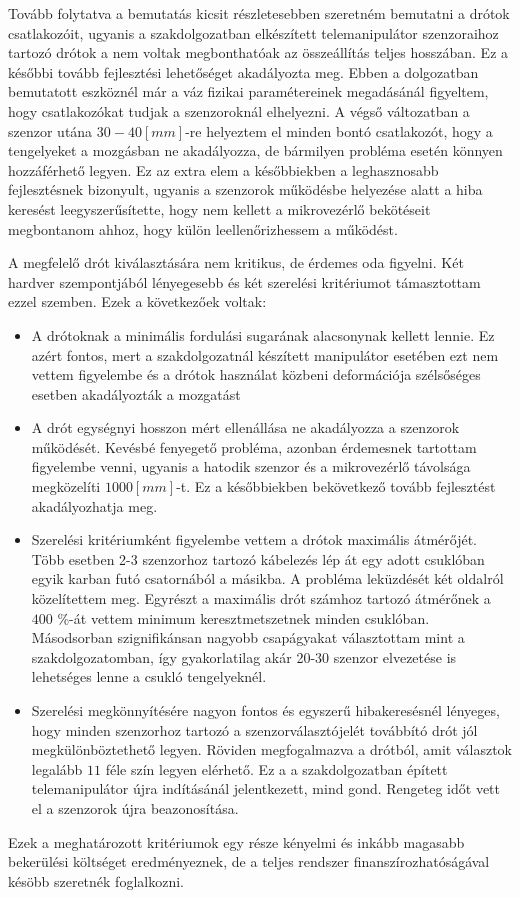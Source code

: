 Tovább folytatva a bemutatás kicsit részletesebben szeretném bemutatni a drótok csatlakozóit, ugyanis a szakdolgozatban elkészített telemanipulátor szenzoraihoz tartozó drótok a nem voltak megbonthatóak az összeállítás teljes hosszában. Ez a későbbi tovább fejlesztési lehetőséget akadályozta meg. Ebben a dolgozatban bemutatott eszköznél már a váz fizikai paramétereinek megadásánál figyeltem, hogy csatlakozókat tudjak a szenzoroknál elhelyezni. A végső változatban a szenzor utána $30-40[mm]$-re helyeztem el minden bontó csatlakozót, hogy a tengelyeket a mozgásban ne akadályozza, de bármilyen probléma esetén könnyen hozzáférhető legyen. Ez az extra elem a későbbiekben a leghasznosabb fejlesztésnek bizonyult, ugyanis a szenzorok működésbe helyezése alatt a hiba keresést leegyszerűsítette, hogy nem kellett a mikrovezérlő bekötéseit megbontanom ahhoz, hogy külön leellenőrizhessem a működést.

A megfelelő drót kiválasztására nem kritikus, de érdemes oda figyelni. Két hardver szempontjából lényegesebb és két szerelési kritériumot támasztottam ezzel szemben. Ezek a következőek voltak:
\begin{itemize}
  \item A drótoknak a minimális fordulási sugarának alacsonynak kellett lennie. Ez azért fontos, mert a szakdolgozatnál készített manipulátor esetében ezt nem vettem figyelembe és a drótok használat közbeni deformációja szélsőséges esetben akadályozták a mozgatást
  \item A drót egységnyi hosszon mért ellenállása ne akadályozza a szenzorok működését. Kevésbé fenyegető probléma, azonban érdemesnek tartottam figyelembe venni, ugyanis a hatodik szenzor és a mikrovezérlő távolsága megközelíti $1000[mm]$-t. Ez a későbbiekben bekövetkező tovább fejlesztést akadályozhatja meg.
  \item Szerelési kritériumként figyelembe vettem a drótok maximális átmérőjét. Több esetben 2-3 szenzorhoz tartozó kábelezés lép át egy adott csuklóban egyik karban futó csatornából a másikba. A probléma leküzdését két oldalról közelítettem meg. Egyrészt a maximális drót számhoz tartozó átmérőnek a $400$ \%-át vettem minimum keresztmetszetnek minden csuklóban. Másodsorban szignifikánsan nagyobb csapágyakat választottam mint a szakdolgozatomban, így gyakorlatilag akár 20-30 szenzor elvezetése is lehetséges lenne a csukló tengelyeknél.
  \item Szerelési megkönnyítésére nagyon fontos és egyszerű hibakeresésnél lényeges, hogy minden szenzorhoz tartozó a szenzorválasztójelét továbbító drót jól megkülönböztethető legyen. Röviden megfogalmazva a drótból, amit választok legalább $11$ féle szín legyen elérhető. Ez a a szakdolgozatban épített telemanipulátor újra indításánál jelentkezett, mind gond. Rengeteg időt vett el a szenzorok újra beazonosítása.
\end{itemize}
Ezek a meghatározott kritériumok egy része kényelmi és inkább magasabb bekerülési költséget eredményeznek, de a teljes rendszer finanszírozhatóságával késöbb szeretnék foglalkozni.

